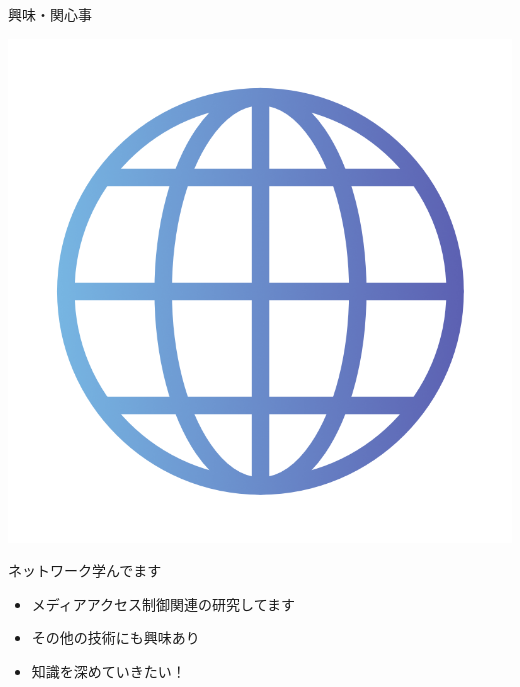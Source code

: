\documentclass[aspectratio=169, dvipdfmx, 11pt]{beamer} %
\begin{document}
\begin{frame}{興味・関心事}
    \begin{minipage}[t]{0.3\textwidth}
      \vspace{0pt}
      \centering
      \includegraphics[width=1.1\linewidth]{fig/kkrn_icon_internet_1.png}
    \end{minipage}%
    \begin{minipage}[t]{0.65\textwidth}
        \vspace{0pt}
        \hspace{0.5cm} %
        \huge
        ネットワーク学んでます
        \vspace{0.5cm} %
        \LARGE
        \begin{itemize}
          \item メディアアクセス制御関連の研究してます
          \item その他の技術にも興味あり
          \item 知識を深めていきたい！
      \end{itemize}
      \end{minipage}
\end{frame}
\end{document}
